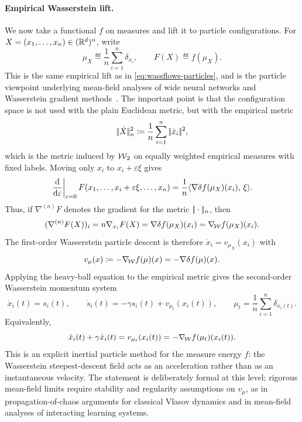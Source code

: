 \paragraph{Empirical Wasserstein lift.}
We now take a functional $f$ on measures and lift it to particle configurations. For $X=(x_1,\ldots,x_n)\in(\mathbb{R}^d)^n$, write
\begin{equation}\label{eq-empirical-momentum-lift}
	\mu_X \eqdef \frac1n\sum_{i=1}^n \delta_{x_i},
	\qquad
	F(X) \eqdef f(\mu_X).
\end{equation}
This is the same empirical lift as in \eqref{eq:wassflows-particles}, and is the particle viewpoint underlying mean-field analyses of wide neural networks and Wasserstein gradient methods~\cite{ChizatBach2018OverparameterizedOT,MeiMontanariNguyen2018MeanFieldNN,RotskoffVandenEijnden2018Trainability}. The important point is that the configuration space is not used with the plain Euclidean metric, but with the empirical metric
\[
	|\!| \dot X |\!|_n^2
	\coloneqq
	\frac1n\sum_{i=1}^n|\!| \dot x_i |\!|^2,
\]
which is the metric induced by $\operatorname{\mathcal{W}}_2$ on equally weighted empirical measures with fixed labels. Moving only $x_i$ to $x_i+\varepsilon \xi$ gives
\[
	\left.\frac{\mathrm{d}}{\mathrm{d}\varepsilon}\right|_{\varepsilon=0}
	F(x_1,\ldots,x_i+\varepsilon\xi,\ldots,x_n)
	=
	\frac1n\langle \nabla\delta f(\mu_X)(x_i),\,\xi\rangle.
\]
Thus, if $\nabla^{(n)}F$ denotes the gradient for the metric $|\!| \cdot |\!|_n$, then
\begin{equation}\label{eq-empirical-lift-gradient}
	(\nabla^{(n)}F(X))_i
	=
	n\nabla_{x_i}F(X)
	=
	\nabla\delta f(\mu_X)(x_i)
	=
	\nabla_{\!\operatorname{\mathcal{W}}} f(\mu_X)(x_i).
\end{equation}
The first-order Wasserstein particle descent is therefore $\dot x_i=v_{\mu_X}(x_i)$ with
\begin{equation}\label{eq-momentum-wasserstein-velocity}
	v_\mu(x)\coloneqq -\nabla_{\!\operatorname{\mathcal{W}}} f(\mu)(x)=-\nabla\delta f(\mu)(x).
\end{equation}
Applying the heavy-ball equation to the empirical metric gives the second-order Wasserstein momentum system
\begin{equation}\label{eq-wasserstein-momentum-particles}
	\dot x_i(t)=s_i(t),
	\qquad
	\dot s_i(t)=-\gamma s_i(t)+v_{\mu_t}(x_i(t)),
	\qquad
	\mu_t=\frac1n\sum_{i=1}^n\delta_{x_i(t)} .
\end{equation}
Equivalently,
\[
	\ddot x_i(t)+\gamma\dot x_i(t)
	=
	v_{\mu_t}(x_i(t))
	=
	-\nabla_{\!\operatorname{\mathcal{W}}} f(\mu_t)(x_i(t)).
\]
This is an explicit inertial particle method for the measure energy $f$: the Wasserstein steepest-descent field acts as an acceleration rather than as an instantaneous velocity. The statement is deliberately formal at this level; rigorous mean-field limits require stability and regularity assumptions on $v_\mu$, as in propagation-of-chaos arguments for classical Vlasov dynamics and in mean-field analyses of interacting learning systems.

